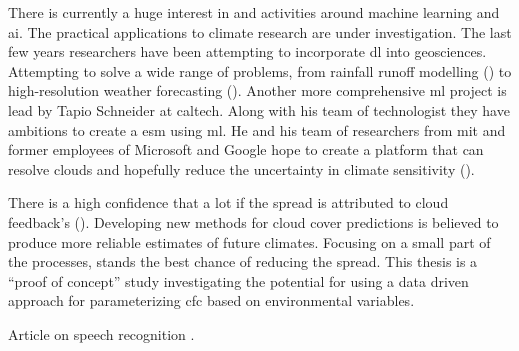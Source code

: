 There is currently a huge interest in and activities around machine learning and \acrshort{ai}. The practical applications to climate research are under investigation. The last few years researchers have been attempting to incorporate \acrshort{dl} into geosciences. Attempting to solve a wide range of problems, from rainfall runoff modelling (\cite{hess-23-5089-2019}) to  high-resolution weather forecasting (\cite{Rodrigues2018DeepDownscale:Forecast}). Another more comprehensive \acrshort{ml} project is lead by Tapio Schneider at \acrfull{caltech}. Along with his team of technologist they have ambitions to create a \acrshort{esm} using \acrshort{ml}. He and his team of researchers from \acrfull{mit} and former employees of Microsoft and Google hope to create a platform that can resolve clouds and hopefully reduce the uncertainty in climate sensitivity (\cite{Voosen2018ScienceIntelligence}).

There is a high confidence that a lot if the spread is attributed to cloud feedback's (\cite{IPCC_CH9_climate_models}). Developing new methods for cloud cover predictions is believed to produce more reliable estimates of future climates. Focusing on a small part of the processes, stands the best chance of reducing the spread. This thesis is a ``proof of concept'' study investigating the potential for using a data driven approach for parameterizing \acrfull{cfc} based on environmental variables.


Article on speech recognition \cite{Sak2014LongRecognition}.



